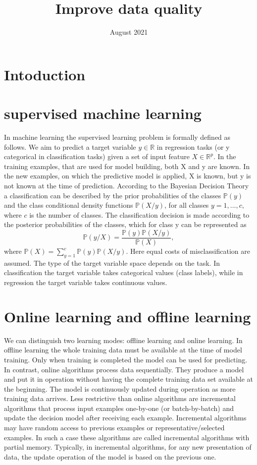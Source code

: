 \documentclass{article}
\title{Improve data quality}
\date{August 2021}
\begin{document}
\section{Intoduction} %
\label{sec:Intoduction}





\section{supervised machine learning}
In machine learning the supervised learning problem is formally defined as follows.
We aim to predict a target variable $y \in \mathbb{R}$ in regression tasks (or y categorical in classification tasks) given a set of input feature $X \in \mathbb{R}^p$.
In the training examples, that are used for model building, both X and y are known.
In the new examples, on which the predictive model is applied, X is known, but y is not known at the time of prediction.
According to the Bayesian Decision Theory a classification can
be described by the prior probabilities of the classes $\mathbb{P}(y)$ and the class conditional density functions $\mathbb{P}(X/y)$, for all classes $y=1,...,c,$ where $c$ is the number of classes.
The classification decision is made according to the posterior probabilities of the classes, which for class y can be represented as
$$\mathbb{P}(y/X) = \frac{\mathbb{P}(y)\mathbb{P}(X/y)}{\mathbb{P}(X)},$$
where $\mathbb{P}(X)= \sum_{y=1}^c \mathbb{P}(y)\mathbb{P}(X/y)$.
Here equal costs of misclassification are assumed.
The type of the target variable space depends on the task.
In classification the target variable takes categorical values (class labels), while in regression the target variable takes continuous values.
\section{Online learning and offline learning}
We can distinguish two learning modes: offline learning and online learning.
In offline learning the whole training data must be available at the time of model training.
Only when training is completed the model can be used for predicting. In contrast, online algorithms process data sequentially. They produce a model and put it in operation without having the complete training data set available at the beginning.
The model is continuously updated during operation as more training data arrives.
Less restrictive than online algorithms are incremental algorithms that process input examples one-by-one (or batch-by-batch) and update the decision model after receiving each example.
Incremental algorithms may have random access to previous examples or representative/selected examples.
In such a case these algorithms are called incremental algorithms with partial memory.
Typically, in incremental algorithms, for any new presentation of data, the update operation of the model is based on the previous one.
\end{document}
